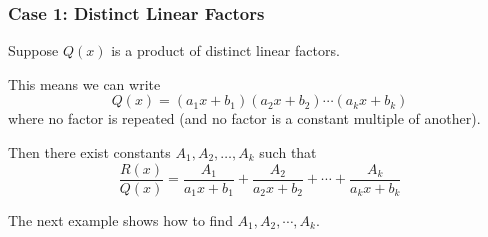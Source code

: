 \begin{frame}\frametitle{Case 1: Distinct Linear Factors}
Suppose $Q(x)$ is a product of distinct linear factors.

This means we can write
\[
Q(x) = (a_1x+b_1)(a_2x+b_2) \cdots (a_kx+b_k)
\]
where no factor is repeated (and no factor is a constant multiple of another).

Then there exist constants $A_1, A_2, \ldots , A_k$ such that
\[
\frac{R(x)}{Q(x)} = \frac{A_1}{a_1x+b_1} + \frac{A_2}{a_2x+b_2} + \cdots + \frac{A_k}{a_kx+b_k}
\]

The next example shows how to find $A_1, A_2, \cdots , A_k$.
\end{frame}
